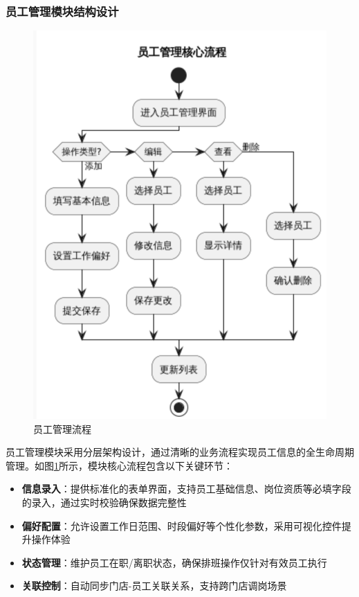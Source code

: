 \documentclass{ctexart}
\begin{document}
\subsubsection{员工管理模块结构设计}

\begin{figure}[H]
    \centering
    \includegraphics[width=0.3\linewidth]{./source/员工管理流程.png}
    \caption{员工管理流程}
    \label{fig:employee-flow}
\end{figure} 
员工管理模块采用分层架构设计，通过清晰的业务流程实现员工信息的全生命周期管理。如图\ref{fig:employee-flow}所示，模块核心流程包含以下关键环节：

\begin{itemize}
    \item \textbf{信息录入}：提供标准化的表单界面，支持员工基础信息、岗位资质等必填字段的录入，通过实时校验确保数据完整性
    \item \textbf{偏好配置}：允许设置工作日范围、时段偏好等个性化参数，采用可视化控件提升操作体验
    \item \textbf{状态管理}：维护员工在职/离职状态，确保排班操作仅针对有效员工执行
    \item \textbf{关联控制}：自动同步门店-员工关联关系，支持跨门店调岗场景
\end{itemize}
\end{document}
